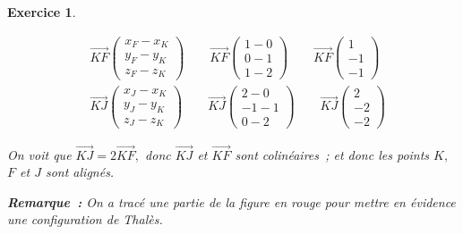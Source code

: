 \documentclass[10pt]{article}
\newtheorem{exo}{Exercice}
\begin{document}
\begin{exo}
\begin{multicols}{2}
\begin{enumerate}
\begin{align*}
&\overrightarrow{KF}\begin{pmatrix} x_F-x_K\\y_F-y_K\\z_F-z_K \end{pmatrix}\qquad 
\overrightarrow{KF}\begin{pmatrix} 1-0\\0-1\\1-2\end{pmatrix}\qquad \overrightarrow{KF}\begin{pmatrix} 1
\\-1\\-1 \end{pmatrix}\\
&\overrightarrow{KJ}\begin{pmatrix} x_J-x_K\\y_J-y_K\\z_J-z_K \end{pmatrix}\qquad 
\overrightarrow{KJ}\begin{pmatrix} 2-0\\-1-1\\0-2\end{pmatrix}\qquad \overrightarrow{KJ}\begin{pmatrix} 2
\\-2\\-2 \end{pmatrix}
\end{align*}

\medskip

On voit que $\overrightarrow{KJ}=2\overrightarrow{KF},$ donc $\overrightarrow{KJ}$ et $\overrightarrow{KF}$ sont colinéaires~; et donc les points $K,$ $F$ et $J$ sont alignés.
\end{enumerate}

\medskip

\textbf{Remarque~:} On a tracé une partie de la figure en rouge pour mettre en évidence une configuration de Thalès.

\end{multicols}
\end{exo}
\end{document}
